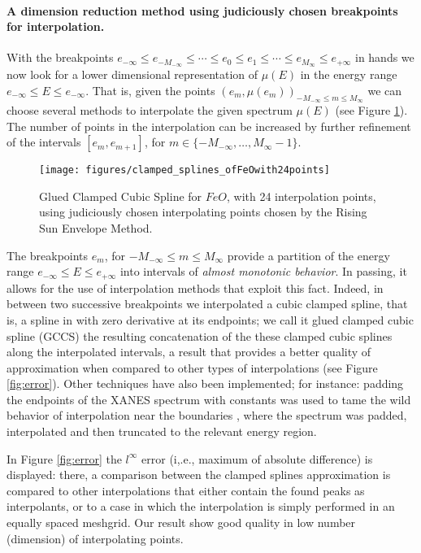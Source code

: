 \documentclass[%
 reprint,
 amsmath,amssymb,
 aps,
]{revtex4-1}
\begin{document}
\paragraph{A dimension reduction method using judiciously chosen  breakpoints for interpolation.}\label{subsec:dimension_reduc}

 With the breakpoints $e_{-\infty}\leq e_{-M_{-\infty}}\leq \cdots\leq  e_0 \leq e_1 \leq \cdots \leq e_{M_{\infty}}\leq e_{+\infty}$ in hands we now look for a lower dimensional representation of $\mu(E)$ in the energy range $e_{-\infty}\leq E \leq e_{-\infty}$. That is, given the points  $\displaystyle{\left(e_{m}, \mu(e_{m})\right)_{-M_{-\infty}\leq m \leq M_{\infty}}}$ we can choose several methods to interpolate the given spectrum $\mu(E)$ (see Figure \ref{fig:clamped_FeO}). The number of points in the interpolation can be increased by further  refinement of the intervals $\left[e_m,e_{m+1}\right]$, for $m \in \{-M_{-\infty},\ldots ,M_{\infty}-1\}$. 
%
\begin{figure}[htb]
 \texttt{[image: figures/clamped\_splines\_ofFeOwith24points]}
 \caption{Glued Clamped Cubic Spline for $FeO$, with 24 interpolation points, using judiciously chosen interpolating points chosen by the  Rising Sun Envelope Method. \label{fig:clamped_FeO}}
\end{figure}
%
The breakpoints $e_{m}$, for $-M_{-\infty}\leq m \leq M_{\infty}$ provide a partition of the energy range $e_{-\infty}\leq E\leq e_{+\infty}$ into intervals of \textit{almost monotonic behavior}. In passing, it allows for the use of interpolation methods that exploit this fact. Indeed, in between two successive breakpoints we interpolated a cubic clamped spline, that is, a spline in  with zero derivative at its endpoints; we call it glued clamped cubic spline (GCCS) the resulting concatenation of the these clamped cubic splines along the interpolated intervals, a result that  provides a better quality of approximation when compared to other types of interpolations (see Figure \ref{fig:error}). Other techniques have also been implemented; for instance: padding the endpoints of the XANES spectrum with constants was used to tame the wild behavior of interpolation near the boundaries \cite[\S 5.2.1]{HaTiFr}, where the spectrum was padded, interpolated and then truncated to the relevant energy region. 
%

In Figure \ref{fig:error} the $l^{\infty}$  error (i,.e., maximum of absolute difference) is displayed: there, a comparison between the clamped splines approximation is compared to other interpolations that either contain the found peaks as interpolants, or to a case in which the interpolation is simply performed in an equally spaced meshgrid. Our result show good quality in low number (dimension) of interpolating points. 
\end{document}
